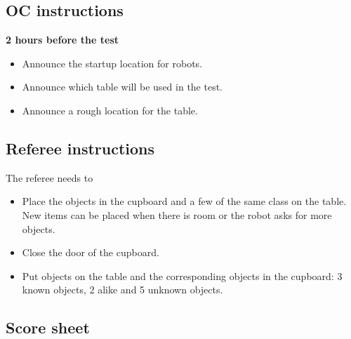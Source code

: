\subsection{OC instructions}

\textbf{2 hours before the test}
\begin{itemize}
    \item Announce the startup location for robots.
    \item Announce which table will be used in the test.
    \item Announce a rough location for the table.
\end{itemize}

\subsection{Referee instructions}
The referee needs to
\begin{itemize}
	\item Place the objects in the cupboard and a few of the same class on the table. New items can be placed when there is room or the robot asks for more objects.
	\item Close the door of the cupboard.
	\item Put objects on the table and the corresponding objects in the cupboard: 3 known objects, 2 alike and 5 unknown objects.
\end{itemize}


\newpage
\subsection{Score sheet}


